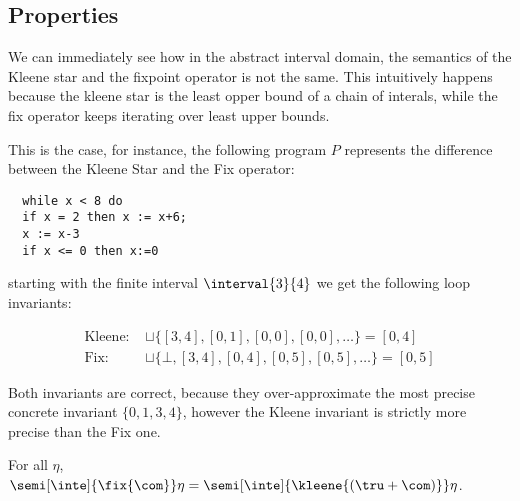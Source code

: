 \subsection{Properties}
\label{sub:intervalsprop}

We can immediately see how in the abstract interval domain, the
semantics of the Kleene star and the fixpoint operator is not the
same. This intuitively happens because the kleene star is the least
opper bound of a chain of interals, while the fix operator keeps
iterating over least upper bounds.

\begin{example} \label{ex:fix}
  This is the case, for instance, the following program \(P\)
  represents the difference between the Kleene Star and the Fix
  operator:
\begin{verbatim}
  while x < 8 do
  if x = 2 then x := x+6;
  x := x-3
  if x <= 0 then x:=0
\end{verbatim}
starting with the finite interval \(\interval{3}{4}\) we get the
following loop invariants:

\begin{align*}
  \text{Kleene: } &\sqcup\{[3,4], [0,1], [0,0], [0,0], \ldots\} = [0,4]\\
  \text{Fix: } & \sqcup\{\bot, [3,4], [0,4], [0,5], [0,5],\ldots\} = [0,5]
\end{align*}

\noindent
Both invariants are correct, because they over-approximate the most
precise concrete invariant \(\{0,1,3,4\}\), however the Kleene
invariant is strictly more precise than the Fix one.
\end{example}

\begin{lemma}\label{le:sugar}
  For all \(\eta\),
  \(\semi[\inte]{\fix{\com}} \eta = \semi[\inte]{\kleene{(\tru + \com)}} \eta\).
\end{lemma}

